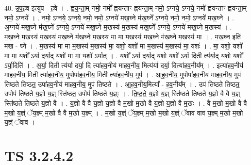\documentclass[17pt]{extarticle}
\begin{document}
40. उ॒प॒ह॒व इत्यु॑प - ह॒वे । . ह्व॒य॒न्ता॒म् नमो॒ नमो᳚ ह्वयन्ताꣳ ह्वयन्ता॒म् नमो॒ ऽग्नये॒ ऽग्नये॒ नमो᳚ ह्वयन्ताꣳ ह्वयन्ता॒म् नमो॒ ऽग्नये᳚ । . नमो॒ ऽग्नये॒ ऽग्नये॒ नमो॒ नमो॒ ऽग्नये॑ मख॒घ्ने म॑ख॒घ्ने᳚ ऽग्नये॒ नमो॒ नमो॒ ऽग्नये॑ मख॒घ्ने । . अ॒ग्नये॑ मख॒घ्ने म॑ख॒घ्ने᳚ ऽग्नये॒ ऽग्नये॑ मख॒घ्ने म॒खस्य॑ म॒खस्य॑ मख॒घ्ने᳚ ऽग्नये॒ ऽग्नये॑ मख॒घ्ने म॒खस्य॑ । . म॒ख॒घ्ने म॒खस्य॑ म॒खस्य॑ मख॒घ्ने म॑ख॒घ्ने म॒खस्य॑ मा मा म॒खस्य॑ मख॒घ्ने म॑ख॒घ्ने म॒खस्य॑ मा । . म॒ख॒घ्न इति॑ मख - घ्ने । . म॒खस्य॑ मा मा म॒खस्य॑ म॒खस्य॑ मा॒ यशो॒ यशो॑ मा म॒खस्य॑ म॒खस्य॑ मा॒ यशः॑ । . मा॒ यशो॒ यशो॑ मा मा॒ यशो᳚ ऽर्या दर्या॒द् यशो॑ मा मा॒ यशो᳚ ऽर्यात् । . यशो᳚ ऽर्या दर्या॒द् यशो॒ यशो᳚ ऽर्या॒ दिती त्य॑र्या॒द् यशो॒ यशो᳚ ऽर्या॒दिति॑ । . अ॒र्या॒ दिती त्य॑र्या दर्या॒ दि त्या॑हव॒नीय॑ माहव॒नीय॒ मित्य॑र्या दर्या॒ दित्या॑हव॒नीय᳚म् । . इत्या॑हव॒नीय॑ माहव॒नीय॒ मिती त्या॑हव॒नीय॒ मुपोपा॑हव॒नीय॒ मिती त्या॑हव॒नीय॒ मुप॑ । . आ॒ह॒व॒नीय॒ मुपोपा॑हव॒नीय॑ माहव॒नीय॒ मुप॑ तिष्ठते तिष्ठत॒ उपा॑हव॒नीय॑ माहव॒नीय॒ मुप॑ तिष्ठते । . आ॒ह॒व॒नीय॒मित्या᳚ - ह॒व॒नीय᳚म् । . उप॑ तिष्ठते तिष्ठत॒ उपोप॑ तिष्ठते य॒ज्ञो य॒ज्ञ् स्ति॑ष्ठत॒ उपोप॑ तिष्ठते य॒ज्ञ्ः । . ति॒ष्ठ॒ते॒ य॒ज्ञो य॒ज्ञ् स्ति॑ष्ठते तिष्ठते य॒ज्ञो वै वै य॒ज्ञ् स्ति॑ष्ठते तिष्ठते य॒ज्ञो वै । . य॒ज्ञो वै वै य॒ज्ञो य॒ज्ञो वै म॒खो म॒खो वै य॒ज्ञो य॒ज्ञो वै म॒खः । . वै म॒खो म॒खो वै वै म॒खो य॒ज्ञ्ं ॅय॒ज्ञ्म् म॒खो वै वै म॒खो य॒ज्ञ्म् । . म॒खो य॒ज्ञ्ं ॅय॒ज्ञ्म् म॒खो म॒खो य॒ज्ञ्ं ॅवाव वाव य॒ज्ञ्म् म॒खो म॒खो य॒ज्ञ्ं ॅवाव । \newline
\pagebreak
{}

\section{ TS 3.2.4.2 }
\end{document}
